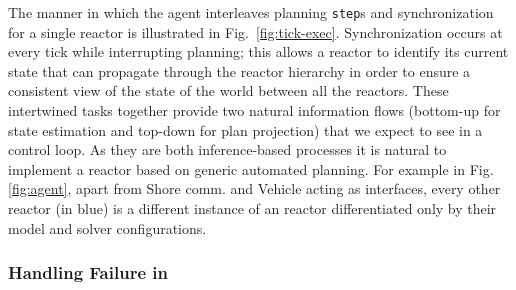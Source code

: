 \begin{figure}[!htbp]
  \centering
  \vskip-1pc
  \qquad
    \caption{\small {}}
  \label{fig:sync-plan-cycle}
\end{figure}

The manner in which the agent interleaves planning \texttt{step}s and
synchronization for a single reactor is illustrated in
Fig.~\ref{fig:tick-exec}. Synchronization occurs at every tick while
interrupting planning; this allows a reactor to identify its current
state that can propagate through the reactor hierarchy in order to
ensure a consistent view of the state of the world between all the
reactors.
These intertwined tasks together provide two natural information flows
(bottom-up for state estimation and top-down for plan projection) that
we expect to see in a control loop. As they are both inference-based
processes it is natural to implement a reactor based on generic
automated planning. For example in Fig. \ref{fig:agent}, apart from
\textsf{Shore comm.} and \textsf{Vehicle} acting as interfaces, every
other reactor (in blue) is a different instance of an \eu reactor
differentiated only by their model and \eu solver configurations.

\subsubsection{Handling  Failure in \rx}
\label{sec:rx-reactor-failure}

